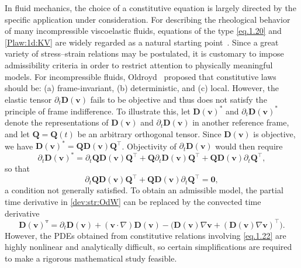 \documentclass[12pt,reqno]{amsart}
\numberwithin{equation}{section}
\theoremstyle{definition}
\def\vv{\boldsymbol{v}}
\def\00{\boldsymbol{0}}
\def\bfQ{\mathbf{Q}}
\def\bfD{\mathbf{D}}
\def\bfQ{\mathbf{Q}}
\begin{document}
In fluid mechanics, the choice of a constitutive equation
is largely directed  by the specific application under consideration.
For describing the rheological behavior of many incompressible viscoelastic
fluids, equations of the type \eqref{eq.1.20} and \eqref{Plaw:1d:KV}
are widely regarded as a natural starting point~\cite{BAH:1987a}.
Since a great variety of stress--strain relations may be postulated,
it is customary to impose admissibility criteria in order to restrict
attention to physically meaningful models. For incompressible fluids,
{Oldroyd}~\cite{Oldroyd:1950} proposed that constitutive laws should be:
(a) frame-invariant, (b) deterministic, and (c) local. However,
the elastic tensor $\partial_t\bfD(\vv)$ fails to be objective and thus
does not satisfy the principle of frame indifference.
To illustrate this, let $\bfD(\vv)^\ast$ and
$\partial_t\bfD(\vv)^\ast$ denote the representations of
$\bfD(\vv)$ and $\partial_t\bfD(\vv)$ in another reference frame,
and let $\bfQ=\bfQ(t)$ be an arbitrary orthogonal tensor. Since
$\bfD(\vv)$ is objective, we have
$\bfD(\vv)^\ast=\bfQ\bfD(\vv)\bfQ^\top$.
Objectivity of $\partial_t\bfD(\vv)$ would then require
\begin{equation*}
\partial_t\bfD(\vv)^\ast
=\partial_t\bfQ\bfD(\vv)\bfQ^\top
+\bfQ\partial_t\bfD(\vv)\bfQ^\top
+\bfQ\bfD(\vv)\partial_t\bfQ^\top,
\end{equation*}
so that
\begin{equation*}
\partial_t\bfQ\bfD(\vv)\bfQ^\top+\bfQ\bfD(\vv)\partial_t\bfQ^\top=\00,
\end{equation*}
a condition not generally satisfied. To obtain an admissible model,
the partial time derivative in \eqref{dev:str:OdW} can be replaced by
the convected time derivative~\cite{BAH:1987a}
\begin{equation}\label{eq.1.22}
\bfD(\vv)^\triangledown
=\partial_t\bfD(\vv)
+(\vv\cdot\nabla)\bfD(\vv)
-\Big(\bfD(\vv)\nabla\vv+(\bfD(\vv)\nabla\vv)^\top\Big).
\end{equation}
However, the PDEs obtained from constitutive relations involving
\eqref{eq.1.22} are highly nonlinear and analytically difficult,
so certain simplifications are required to make a rigorous
mathematical study feasible.


	
\end{document}
